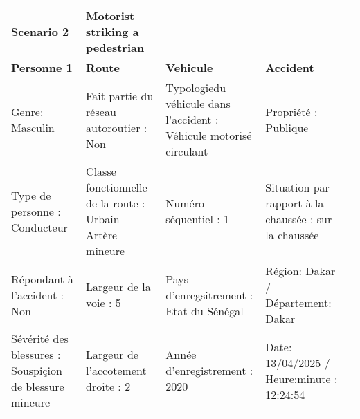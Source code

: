 \documentclass[a4paper,12pt,twoside,french]{book}
[a4paper,12pt,twoside]
\begin{document}
\begin{landscape}

\begin{table}[]
\centering
\begin{adjustbox}{width=2.1\textwidth,center=\textwidth}

\begin{tabular}{|l|l|l|l|l|}
\hline
\textbf{Scenario 2}                                                                                                & \textbf{Motorist striking a pedestrian}                     &                                                                                     &                                                                                    &  \\
\textbf{Personne 1}                                                                                                  & \textbf{Route}                                              & \textbf{Vehicule}                                                                   & \textbf{Accident}                                                                  &  \\
Genre: Masculin                                                                                                      & Fait partie du réseau autoroutier : Non                     & Typologiedu véhicule dans l'accident : Véhicule motorisé circulant                  & Propriété : Publique                                                               &  \\
Type de personne : Conducteur                                                                                        & Classe fonctionnelle de la route : Urbain - Artère mineure  & Numéro séquentiel : 1                                                               & Situation par rapport à la chaussée : sur la chaussée                              &  \\
Répondant à l'accident : Non                                                                                         & Largeur de la voie : 5                                      & Pays d'enregsitrement : Etat du Sénégal                                             & Région: Dakar / Département: Dakar                                                 &  \\
Sévérité des blessures : Souspiçion de   blessure mineure                                                            & Largeur de l'accotement droite : 2                          & Année d'enregistrement : 2020                                                       & Date: 13/04/2025 / Heure:minute : 12:24:54                                         &  \\

\end{tabular}
\end{adjustbox}
\end{table}
\end{landscape}
\end{document}
